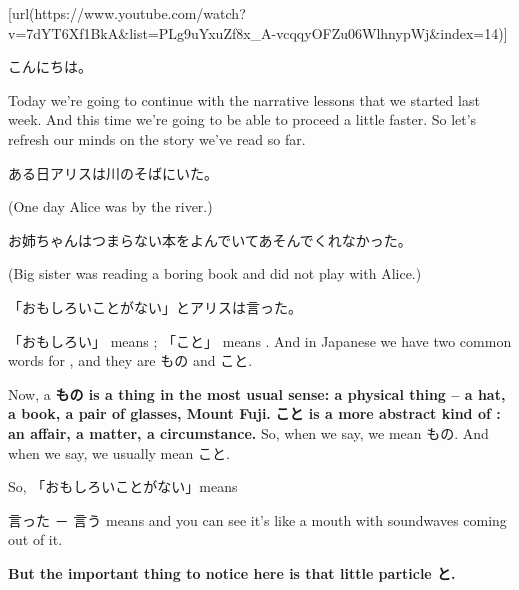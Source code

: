 \startsectionlevel[title={{\bf 12. Quotation particle と, compound verbs & nouns}},reference={quotation-particle-と-compound-verbs-nouns}]

[url(https://www.youtube.com/watch?v=7dYT6Xf1BkA&list=PLg9uYxuZf8x_A-vcqqyOFZu06WlhnypWj&index=14)]

こんにちは。

Today we're going to continue with the narrative lessons that we started last week. And this time we're going to be able to proceed a little faster. So let's refresh our minds on the story we've read so far.

\startblockquote
ある日アリスは川のそばにいた。
\stopblockquote

(One day Alice was by the river.)

\startblockquote
お姉ちゃんはつまらない本をよんでいてあそんでくれなかった。
\stopblockquote

(Big sister was reading a boring book and did not play with Alice.)

\startblockquote
「おもしろいことがない」とアリスは言った。
\stopblockquote

{}

「おもしろい」 means ; 「こと」 means . And in Japanese we have two common words for  , and they are もの and こと.

{}

Now, a {\bf もの is a thing in the most usual sense: a physical thing -- a hat, a book, a pair of glasses, Mount Fuji.} {\bf こと is a more abstract kind of : an affair, a matter, a circumstance.} So, when we say,  we mean もの. And when we say,  we usually mean こと.

So, 「おもしろいことがない」means 

言った － 言う means  and you can see it's like a mouth with soundwaves coming out of it.

{}

{\bf But the important thing to notice here is that little particle と.}

{}

